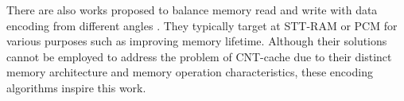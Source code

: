 There are also works proposed to balance memory read and write with 
data encoding from different angles \cite{cho2009flip} 
\cite{jacobvitz2013coset} \cite{seyedzadeh2015pres}. They typically  
target at STT-RAM or PCM for various purposes such as improving 
memory lifetime. Although their solutions cannot be employed to address the problem of CNT-cache due to their distinct memory architecture and memory operation characteristics, 
these encoding algorithms inspire this work.

